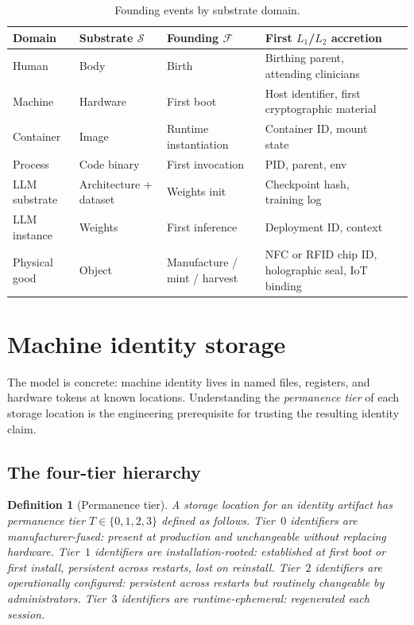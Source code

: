 \documentclass[11pt,a4paper,parskip=half-,DIV=12,headings=standardclasses]{scrartcl}
\theoremstyle{ncthm}
\theoremstyle{ncdef}
\newtheorem{definition}[theorem]{Definition}
\newcommand{\substrate}{\mathcal{S}}
\newcommand{\founding}{\mathcal{F}}
\begin{document}
\begin{table}[h]
\centering
\begin{tabular}{@{}lllll@{}}
\toprule
\textsf{Domain} & \textsf{Substrate $\substrate$} & \textsf{Founding $\founding$} & \textsf{First $L_1$/$L_2$ accretion}\\
\midrule
Human    & Body            & Birth                  & Birthing parent, attending clinicians\\
Machine  & Hardware        & First boot             & Host identifier, first cryptographic material\\
Container & Image           & Runtime instantiation  & Container ID, mount state\\
Process  & Code binary     & First invocation       & PID, parent, env\\
LLM substrate & Architecture + dataset & Weights init    & Checkpoint hash, training log\\
LLM instance  & Weights         & First inference   & Deployment ID, context\\
Physical good & Object          & Manufacture / mint / harvest & NFC or RFID chip ID, holographic seal, IoT binding\\
\bottomrule
\end{tabular}
\caption{Founding events by substrate domain.}
\label{tab:founding-schema}
\end{table}

\section{Machine identity storage}\label{sec:machine-storage}

The model is concrete: machine identity lives in named files,
registers, and hardware tokens at known locations. Understanding the
\emph{permanence tier} of each storage location is the engineering
prerequisite for trusting the resulting identity claim.

\subsection{The four-tier hierarchy}

\begin{definition}[Permanence tier]\label{def:tier}
A storage location for an identity artifact has \emph{permanence tier}
$T \in \{0,1,2,3\}$ defined as follows. Tier~$0$ identifiers are
\emph{manufacturer-fused}: present at production and unchangeable
without replacing hardware. Tier~$1$ identifiers are
\emph{installation-rooted}: established at first boot or first
install, persistent across restarts, lost on reinstall. Tier~$2$
identifiers are \emph{operationally configured}: persistent across
restarts but routinely changeable by administrators. Tier~$3$
identifiers are \emph{runtime-ephemeral}: regenerated each session.
\end{definition}
\end{document}
